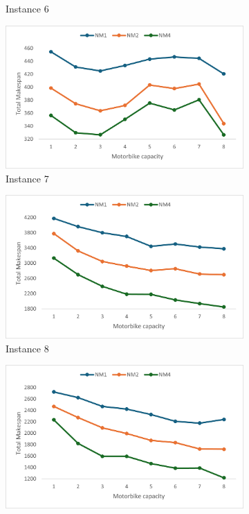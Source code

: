 \documentclass{article}
\begin{document}
\begin{figure}[h]
\begin{subfigure}{0.33\textwidth}
			\caption{Instance 6}
			\label{fig:p06_avg}
		\end{subfigure}
		\par
		\bigskip
		\begin{subfigure}{0.33\textwidth}
			\centering
			\includegraphics[scale=0.42]{Instance7}\;
			\caption{Instance 7}
			\label{fig:p07_avg}
		\end{subfigure}
		\begin{subfigure}{0.33\textwidth}
			\centering
			\includegraphics[scale=0.42]{Instance8}\;
			\caption{Instance 8}
			\label{fig:p08_avg}
		\end{subfigure}
		\begin{subfigure}{0.33\textwidth}
			\centering
			\includegraphics[scale=0.42]{Instance9}\;

\end{subfigure}
\end{figure}
\end{document}
